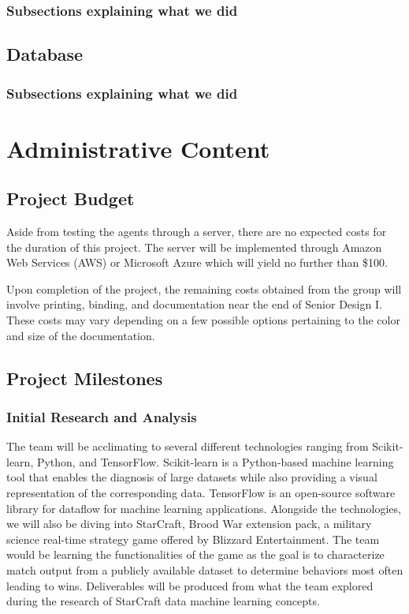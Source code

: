 \documentclass[a4paper,12pt]{report}
\begin{document}
\subsection{Subsections explaining what we did}
\section{Database}
\subsection{Subsections explaining what we did}

\chapter{Administrative Content}
\section{Project Budget}

Aside from testing the agents through a server, there are no expected costs for the duration of this project. The server will be implemented through Amazon Web Services (AWS) or Microsoft Azure which will yield no further than \$100.

Upon completion of the project, the remaining costs obtained from the group will involve printing, binding, and documentation near the end of Senior Design I. These costs may vary depending on a few possible options pertaining to the color and size of the documentation.

\section{Project Milestones}

\subsection{Initial Research and Analysis}

The team will be acclimating to several different technologies ranging from Scikit-learn, Python, and TensorFlow. Scikit-learn is a Python-based machine learning tool that enables the diagnosis of large datasets while also providing a visual representation of the corresponding data. TensorFlow is an open-source software library for dataflow for machine learning applications. Alongside the technologies, we will also be diving into StarCraft, Brood War extension pack, a military science real-time strategy game offered by Blizzard Entertainment. The team would be learning the functionalities of the game as the goal is to characterize match output from a publicly available dataset to determine behaviors most often leading to wins. Deliverables will be produced from what the team explored during the research of StarCraft data machine learning concepts.
\end{document}
